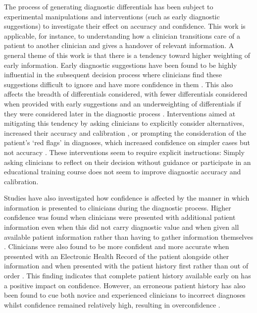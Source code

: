 \documentclass[a4paper, nobind]{templates/ociamthesis}
\begin{document}
The process of generating diagnostic differentials has been subject to experimental manipulations and interventions (such as early diagnostic suggestions) to investigate their effect on accuracy and confidence. This work is applicable, for instance, to understanding how a clinician transitions care of a patient to another clinician and gives a handover of relevant information. A general theme of this work is that there is a tendency toward higher weighting of early information. Early diagnostic suggestions have been found to be highly influential in the subsequent decision process where clinicians find these suggestions difficult to ignore and have more confidence in them \autocite{kammer_differential_2021,kourtidis_influences_2022}. This also affects the breadth of differentials considered, with fewer differentials considered when provided with early suggestions \autocite{kourtidis_influences_2022,staal_does_2022} and an underweighting of differentials if they were considered later in the diagnostic process \autocite{eva_influence_2001}. Interventions aimed at mitigating this tendency by asking clinicians to explicitly consider alternatives, increased their accuracy and calibration \autocite{feyzi-behnagh_metacognitive_2014}, or prompting the consideration of the patient's `red flags' in diagnoses, which increased confidence on simpler cases but not accuracy \autocite{chartan_isolating_2019}. These interventions seem to require explicit instructions: Simply asking clinicians to reflect on their decision without guidance \autocite{lambe_guided_2018,costa_filho_effects_2019} or participate in an educational training course \autocite{benvenuto-andrade_level_2006,kuhn_learning_2023} does not seem to improve diagnostic accuracy and calibration.

Studies have also investigated how confidence is affected by the manner in which information is presented to clinicians during the diagnostic process. Higher confidence was found when clinicians were presented with additional patient information even when this did not carry diagnostic value \autocite{heller_heuristics_1992} and when given all available patient information rather than having to gather information themselves \autocite{gruppen_information_1991}. Clinicians were also found to be more confident and more accurate when presented with an Electronic Health Record of the patient alongside other information \autocite{ben-assuli_improving_2015} and when presented with the patient history first rather than out of order \autocite{tio_effect_2022}. This finding indicates that complete patient history available early on has a positive impact on confidence. However, an erroneous patient history has also been found to cue both novice and experienced clinicians to incorrect diagnoses whilst confidence remained relatively high, resulting in overconfidence \autocite{fawver_seeing_2020}.
\end{document}
